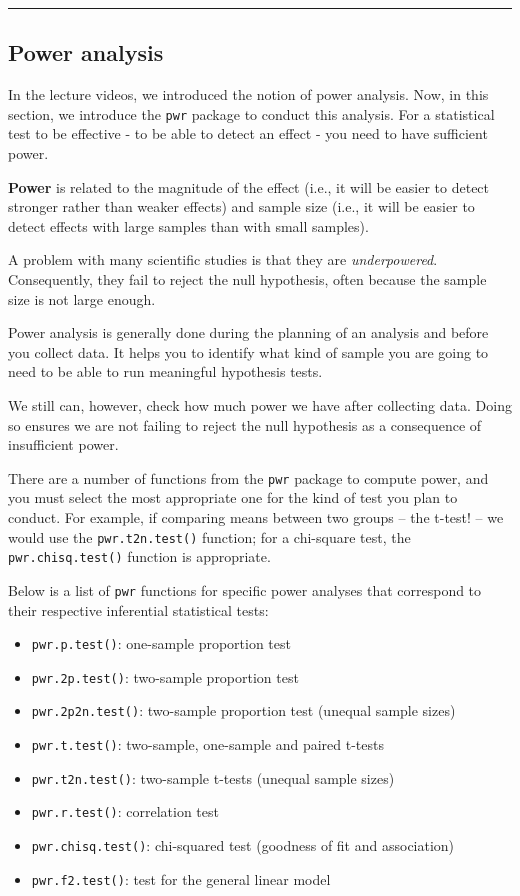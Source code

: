 \documentclass[
]{book}
\providecommand{\tightlist}{%
  \setlength{\itemsep}{0pt}\setlength{\parskip}{0pt}}
\begin{document}
\begin{center}\rule{0.5\linewidth}{0.5pt}\end{center}

\hypertarget{power-analysis}{%
\subsection{Power analysis}\label{power-analysis}}

In the lecture videos, we introduced the notion of power analysis. Now, in this section, we introduce the \texttt{pwr} package to conduct this analysis. For a statistical test to be effective - to be able to detect an effect - you need to have sufficient power.

\textbf{Power} is related to the magnitude of the effect (i.e., it will be easier to detect stronger rather than weaker effects) and sample size (i.e., it will be easier to detect effects with large samples than with small samples).

A problem with many scientific studies is that they are \emph{underpowered}. Consequently, they fail to reject the null hypothesis, often because the sample size is not large enough.

Power analysis is generally done during the planning of an analysis and before you collect data. It helps you to identify what kind of sample you are going to need to be able to run meaningful hypothesis tests.

We still can, however, check how much power we have after collecting data. Doing so ensures we are not failing to reject the null hypothesis as a consequence of insufficient power.

There are a number of functions from the \texttt{pwr} package to compute power, and you must select the most appropriate one for the kind of test you plan to conduct. For example, if comparing means between two groups -- the t-test! -- we would use the \texttt{pwr.t2n.test()} function; for a chi-square test, the \texttt{pwr.chisq.test()} function is appropriate.

Below is a list of \texttt{pwr} functions for specific power analyses that correspond to their respective inferential statistical tests:

\begin{itemize}
\tightlist
\item
  \texttt{pwr.p.test()}: one-sample proportion test
\item
  \texttt{pwr.2p.test()}: two-sample proportion test
\item
  \texttt{pwr.2p2n.test()}: two-sample proportion test (unequal sample sizes)
\item
  \texttt{pwr.t.test()}: two-sample, one-sample and paired t-tests
\item
  \texttt{pwr.t2n.test()}: two-sample t-tests (unequal sample sizes)
\item
  \texttt{pwr.r.test()}: correlation test
\item
  \texttt{pwr.chisq.test()}: chi-squared test (goodness of fit and association)
\item
  \texttt{pwr.f2.test()}: test for the general linear model
\end{itemize}
\end{document}
